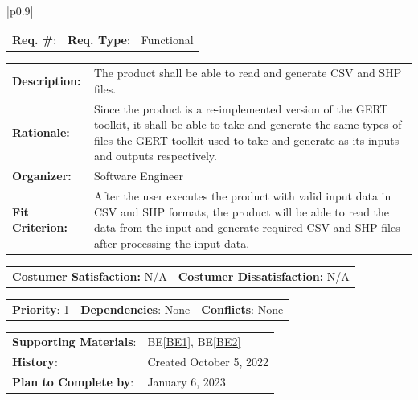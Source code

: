 \documentclass[12pt, titlepage]{article}
\newcommand{\beref}[1]{BE\ref{#1}}
\newcounter{reqnum}
\newcommand{\reqthereqnum}{\textbf{Req. \#}: \thereqnum}
\newenvironment{boxed}
    {\begin{center}
    \begin{tabular}{|p{0.9\textwidth}|}
    \hline\\
    }
    { 
    \\\\\hline
    \end{tabular} 
    \end{center}
    }
\begin{document}
\begin{boxed}
\begin{tabular}{l r r}
{reqnum} \reqthereqnum \label{Req1} & {\bf Req. Type}: &  Functional\\
\end{tabular}
\newline
\begin{tabular}{l p{11.5cm}}
    {\bf Description:} & The product shall be able to read and generate CSV and SHP files.  \\
    {\bf Rationale:} & Since the product is a re-implemented version of the GERT toolkit, it shall be able to take and generate the same types of files the GERT toolkit used to take and generate as its inputs and outputs respectively.\\
    {\bf Organizer:} & Software Engineer\\
    {\bf Fit Criterion:} & After the user executes the product with valid input data in CSV and SHP formats, the product will be able to read the data from the input and generate required CSV and SHP files after processing the input data.\\
\end{tabular}
\begin{tabular}{l r}
{\bf Costumer Satisfaction:} N/A &  {\bf Costumer Dissatisfaction:}  N/A\\
\end{tabular}
\begin{tabular}{l r r}
    {\bf Priority}: 1 & {\bf Dependencies}: None  & {\bf Conflicts}: None \\
\end{tabular}
\begin{tabular}{l l}
     {\bf Supporting Materials}:& 
     \beref{BE1}, \beref{BE2} \\ 
     {\bf History}: & Created October 5, 2022\\
     {\bf Plan to Complete by}: & January 6, 2023\\
\end{tabular}
\end{boxed}
\end{document}
